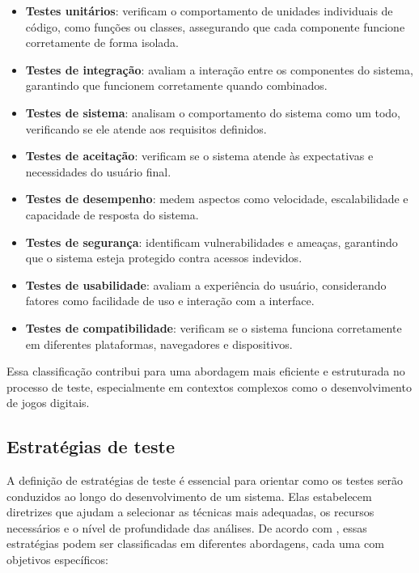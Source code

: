 \begin{itemize}
    \item \textbf{Testes unitários}: verificam o comportamento de unidades individuais de código, como funções ou classes, assegurando que cada componente funcione corretamente de forma isolada.
    
    \item \textbf{Testes de integração}: avaliam a interação entre os componentes do sistema, garantindo que funcionem corretamente quando combinados.
    
    \item \textbf{Testes de sistema}: analisam o comportamento do sistema como um todo, verificando se ele atende aos requisitos definidos.
    
    \item \textbf{Testes de aceitação}: verificam se o sistema atende às expectativas e necessidades do usuário final.
    
    \item \textbf{Testes de desempenho}: medem aspectos como velocidade, escalabilidade e capacidade de resposta do sistema.
    
    \item \textbf{Testes de segurança}: identificam vulnerabilidades e ameaças, garantindo que o sistema esteja protegido contra acessos indevidos.
    
    \item \textbf{Testes de usabilidade}: avaliam a experiência do usuário, considerando fatores como facilidade de uso e interação com a interface.
    
    \item \textbf{Testes de compatibilidade}: verificam se o sistema funciona corretamente em diferentes plataformas, navegadores e dispositivos.
\end{itemize}

Essa classificação contribui para uma abordagem mais eficiente e estruturada no processo de teste, especialmente em contextos complexos como o desenvolvimento de jogos digitais.

\subsection{Estratégias de teste}

A definição de estratégias de teste é essencial para orientar como os testes serão conduzidos ao longo do desenvolvimento de um sistema. Elas estabelecem diretrizes que ajudam a selecionar as técnicas mais adequadas, os recursos necessários e o nível de profundidade das análises. De acordo com , essas estratégias podem ser classificadas em diferentes abordagens, cada uma com objetivos específicos:


